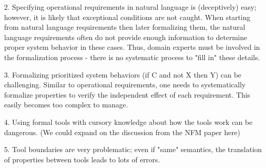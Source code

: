 2. Specifying operational requirements in natural language is (deceptively) easy; however, it is likely that exceptional conditions are not caught.  When starting from natural language requirements then later formalizing them, the natural language requirements often do not provide enough information to determine proper system behavior in these cases.  Thus, domain experts must be involved in the formalization process - there is no systematic process to "fill in" these details.

3. Formalizing prioritized system behaviors (if C and not X then Y) can be challenging. Similar to operational requirements, one needs to systematically formalize properties to verify the independent effect of each requirement. This easily becomes too complex to manage.

4. Using formal tools with cursory knowledge about how the tools work can be dangerous.
(We could expand on the discussion from the NFM paper here)

5. Tool boundaries are very problematic; even if "same" semantics, the translation of properties between tools
  leads to lots of errors.

